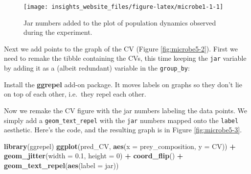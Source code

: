 \documentclass[]{book}
\newenvironment{Shaded}{\begin{snugshade}}{\end{snugshade}}
\newcommand{\DataTypeTok}[1]{\textcolor[rgb]{0.13,0.29,0.53}{#1}}
\newcommand{\DecValTok}[1]{\textcolor[rgb]{0.00,0.00,0.81}{#1}}
\newcommand{\FloatTok}[1]{\textcolor[rgb]{0.00,0.00,0.81}{#1}}
\newcommand{\KeywordTok}[1]{\textcolor[rgb]{0.13,0.29,0.53}{\textbf{#1}}}
\newcommand{\NormalTok}[1]{#1}
\newcommand{\OperatorTok}[1]{\textcolor[rgb]{0.81,0.36,0.00}{\textbf{#1}}}
\newcommand{\StringTok}[1]{\textcolor[rgb]{0.31,0.60,0.02}{#1}}
\begin{document}
\begin{figure}

{\centering \texttt{[image: insights\_website\_files/figure-latex/microbe1-1-1]} 

}

\caption{Jar numbers added to the plot of population dynamics observed during the experiment.}\label{fig:microbe1-1}
\end{figure}

Next we add points to the graph of the CV (Figure \ref{fig:microbe5-2}). First we need to remake the tibble containing the CVs, this time keeping the \texttt{jar} variable by adding it as a (albeit redundant) variable in the \texttt{group\_by}:

\begin{Shaded}
\end{Shaded}

\begin{action}
Install the \textbf{ggrepel} add-on package. It moves labels on graphs
so they don't lie on top of each other, i.e.~they repel each other.
\end{action}

Now we remake the CV figure with the jar numbers labeling the data points. We simply add a \texttt{geom\_text\_repel} with the \texttt{jar} numbers mapped onto the \texttt{label} aesthetic. Here's the code, and the resulting graph is in Figure \ref{fig:microbe5-3}.

\begin{Shaded}
\begin{Highlighting}[]
\KeywordTok{library}\NormalTok{(ggrepel)}
\KeywordTok{ggplot}\NormalTok{(pred_CV, }\KeywordTok{aes}\NormalTok{(}\DataTypeTok{x =}\NormalTok{ prey_composition, }\DataTypeTok{y =}\NormalTok{ CV)) }\OperatorTok{+}
\StringTok{  }\KeywordTok{geom_jitter}\NormalTok{(}\DataTypeTok{width =} \FloatTok{0.1}\NormalTok{, }\DataTypeTok{height =} \DecValTok{0}\NormalTok{) }\OperatorTok{+}
\StringTok{  }\KeywordTok{coord_flip}\NormalTok{() }\OperatorTok{+}
\StringTok{  }\KeywordTok{geom_text_repel}\NormalTok{(}\KeywordTok{aes}\NormalTok{(}\DataTypeTok{label =}\NormalTok{ jar))}
\end{Highlighting}
\end{Shaded}
\end{document}
